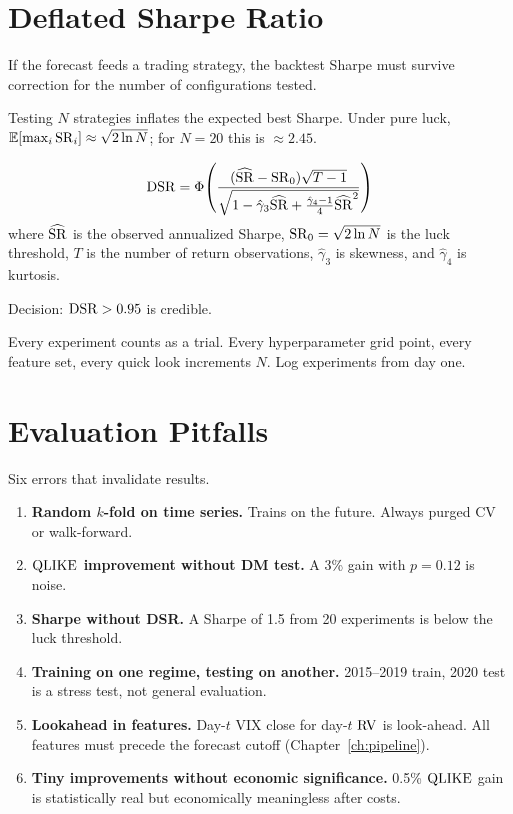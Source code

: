 \section{Deflated Sharpe Ratio}
\label{sec:dsr}

If the forecast feeds a trading strategy, the backtest Sharpe must survive correction for the number of configurations tested.

Testing $N$ strategies inflates the expected best Sharpe.
Under pure luck, $\mathbb{E}[\max_i \operatorname{SR}_i] \approx \sqrt{2 \ln N}$; for $N = 20$ this is $\approx 2.45$.

\begin{equation}
\label{eq:dsr}
\operatorname{DSR} = \Phi\!\left(\frac{(\widehat{\operatorname{SR}} - \operatorname{SR}_0)\sqrt{T-1}}{\sqrt{1 - \hat{\gamma}_3 \widehat{\operatorname{SR}} + \frac{\hat{\gamma}_4 - 1}{4}\widehat{\operatorname{SR}}^2}}\right)
\end{equation}
where $\widehat{\operatorname{SR}}$ is the observed annualized Sharpe, $\operatorname{SR}_0 = \sqrt{2\ln N}$ is the luck threshold, $T$ is the number of return observations, $\hat{\gamma}_3$ is skewness, and $\hat{\gamma}_4$ is kurtosis.

Decision: $\operatorname{DSR} > 0.95$ is credible.

\begin{warning}
Every experiment counts as a trial.
Every hyperparameter grid point, every feature set, every quick look increments $N$.
Log experiments from day one.
\end{warning}


\section{Evaluation Pitfalls}
\label{sec:eval-pitfalls}

Six errors that invalidate results.

\begin{warning}
\begin{enumerate}[nosep]
  \item \textbf{Random $k$-fold on time series.} Trains on the future.
    Always purged CV or walk-forward.
  \item \textbf{$\operatorname{QLIKE}$ improvement without DM test.} A 3\% gain with $p = 0.12$ is noise.
  \item \textbf{Sharpe without DSR.} A Sharpe of 1.5 from 20 experiments is below the luck threshold.
  \item \textbf{Training on one regime, testing on another.} 2015--2019 train, 2020 test is a stress test, not general evaluation.
  \item \textbf{Lookahead in features.} Day-$t$ VIX close for day-$t$ $\operatorname{RV}$ is look-ahead.
    All features must precede the forecast cutoff (Chapter~\ref{ch:pipeline}).
  \item \textbf{Tiny improvements without economic significance.} 0.5\% $\operatorname{QLIKE}$ gain is statistically real but economically meaningless after costs.
\end{enumerate}
\end{warning}


